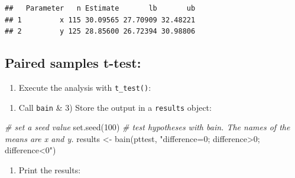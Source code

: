 \documentclass[
]{book}
\newenvironment{Shaded}{\begin{snugshade}}{\end{snugshade}}
\newcommand{\AttributeTok}[1]{\textcolor[rgb]{0.77,0.63,0.00}{#1}}
\newcommand{\CommentTok}[1]{\textcolor[rgb]{0.56,0.35,0.01}{\textit{#1}}}
\newcommand{\ConstantTok}[1]{\textcolor[rgb]{0.00,0.00,0.00}{#1}}
\newcommand{\DecValTok}[1]{\textcolor[rgb]{0.00,0.00,0.81}{#1}}
\newcommand{\FunctionTok}[1]{\textcolor[rgb]{0.00,0.00,0.00}{#1}}
\newcommand{\NormalTok}[1]{#1}
\newcommand{\OtherTok}[1]{\textcolor[rgb]{0.56,0.35,0.01}{#1}}
\newcommand{\SpecialCharTok}[1]{\textcolor[rgb]{0.00,0.00,0.00}{#1}}
\newcommand{\StringTok}[1]{\textcolor[rgb]{0.31,0.60,0.02}{#1}}
\providecommand{\tightlist}{%
  \setlength{\itemsep}{0pt}\setlength{\parskip}{0pt}}
\begin{document}
\begin{verbatim}
##   Parameter   n Estimate       lb       ub
## 1         x 115 30.09565 27.70909 32.48221
## 2         y 125 28.85600 26.72394 30.98806
\end{verbatim}

\hypertarget{paired-samples-t-test}{%
\subsection{Paired samples t-test:}\label{paired-samples-t-test}}

\begin{enumerate}
\def\labelenumi{\arabic{enumi})}
\tightlist
\item
  Execute the analysis with \texttt{t\_test()}:
\end{enumerate}

\begin{Shaded}
\end{Shaded}

\begin{enumerate}
\def\labelenumi{\arabic{enumi})}
\setcounter{enumi}{1}
\tightlist
\item
  Call \texttt{bain} \& 3) Store the output in a \texttt{results} object:
\end{enumerate}

\begin{Shaded}
\begin{Highlighting}[]
\CommentTok{\# set a seed value}
\FunctionTok{set.seed}\NormalTok{(}\DecValTok{100}\NormalTok{)}
\CommentTok{\# test hypotheses with bain. The names of the means are x and y.}
\NormalTok{results }\OtherTok{\textless{}{-}} \FunctionTok{bain}\NormalTok{(pttest, }\StringTok{"difference=0; difference\textgreater{}0; difference\textless{}0"}\NormalTok{)}
\end{Highlighting}
\end{Shaded}

\begin{enumerate}
\def\labelenumi{\arabic{enumi})}
\setcounter{enumi}{2}
\tightlist
\item
  Print the results:
\end{enumerate}
\end{document}
